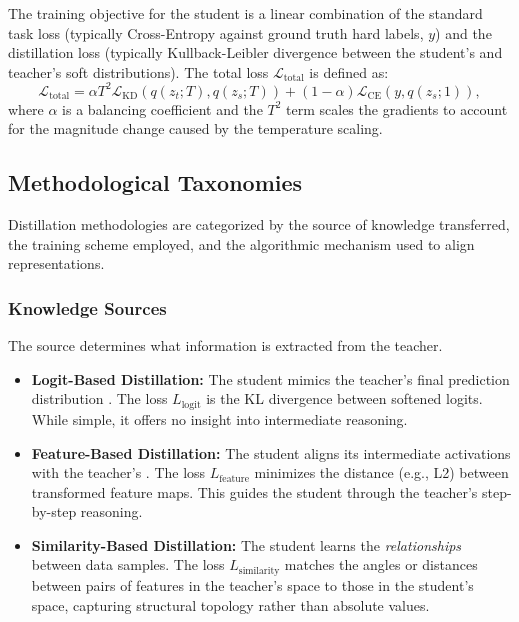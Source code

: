The training objective for the student is a linear combination of the standard task loss (typically Cross-Entropy against ground truth hard labels, $y$) and the distillation loss (typically Kullback-Leibler divergence between the student's and teacher's soft distributions). The total loss $\mathcal{L}_{\text{total}}$ is defined as:
\begin{equation}
    \mathcal{L}_{\text{total}} = \alpha T^2 \mathcal{L}_{\text{KD}}(q(z_t; T), q(z_s; T)) + (1-\alpha) \mathcal{L}_{\text{CE}}(y, q(z_s; 1)),
    \label{eq:kd_loss}
\end{equation}
where $\alpha$ is a balancing coefficient and the $T^2$ term scales the gradients to account for the magnitude change caused by the temperature scaling.

\subsection{Methodological Taxonomies}

Distillation methodologies are categorized by the source of knowledge transferred, the training scheme employed, and the algorithmic mechanism used to align representations.

\subsubsection{Knowledge Sources}
The source determines what information is extracted from the teacher.
\begin{itemize}
    \item \textbf{Logit-Based Distillation:} The student mimics the teacher's final prediction distribution \cite{hinton2015distilling}. The loss $L_{\text{logit}}$ is the KL divergence between softened logits. While simple, it offers no insight into intermediate reasoning.
    \item \textbf{Feature-Based Distillation:} The student aligns its intermediate activations with the teacher's \cite{Romero2014}. The loss $L_{\text{feature}}$ minimizes the distance (e.g., L2) between transformed feature maps. This guides the student through the teacher's step-by-step reasoning.
    \item \textbf{Similarity-Based Distillation:} The student learns the \emph{relationships} between data samples. The loss $L_{\text{similarity}}$ matches the angles or distances between pairs of features in the teacher's space to those in the student's space, capturing structural topology rather than absolute values.
\end{itemize}

